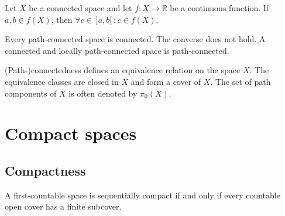     \begin{theorem}\label{topology:intermediate_value_theorem}
        Let $X$ be a connected space and let $f:X\rightarrow\mathbb{R}$ be a continuous function. If $a,b\in f(X)$, then $\forall c\in\ ]a,b[\ :c\in f(X)$.
    \end{theorem}


    \begin{property}
        Every path-connected space is connected. The converse does not hold. A connected and locally path-connected space is path-connected.
    \end{property}

    \begin{remark}\label{topology:connected_components}
        (Path-)connectedness defines an equivalence relation on the space $X$. The equivalence classes are closed in $X$ and form a cover of $X$. The set of path components of $X$ is often denoted by $\pi_0(X)$.
    \end{remark}

\section{Compact spaces}\label{section:compact}
\subsection{Compactness}


    \begin{property}
        A first-countable space is sequentially compact if and only if every countable open cover has a finite subcover.
    \end{property}

